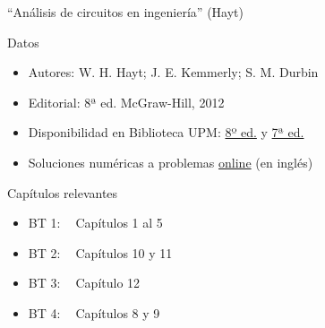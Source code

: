 \documentclass[aspectratio=169, usenames,svgnames,dvipsnames]{beamer}
\begin{document}

\begin{frame}{``Análisis de circuitos en ingeniería'' (\alert{Hayt})}
    \begin{block}{Datos}
        \begin{itemize}
        \item Autores: W. H. Hayt; J. E. Kemmerly; S. M. Durbin
        \item Editorial: 8ª ed. McGraw-Hill, 2012
        \item Disponibilidad en Biblioteca UPM: \href{https://ingenio.upm.es/primo-explore/fulldisplay?docid=34UPM\_ALMA2167505120004212\&context=L\&vid=34UPM\_VU1\&search\_scope=TAB1\_SCOPE1\&isFrbr=true\&tab=tab1\&lang=es\_ES}{8º ed.} y \href{https://ingenio.upm.es/primo-explore/fulldisplay?docid=34UPM\_ALMA2154460960004212\&context=L\&vid=34UPM\_VU1\&search\_scope=TAB1\_SCOPE1\&isFrbr=true\&tab=tab1\&lang=es\_ES}{7ª ed.}
        \item Soluciones numéricas a problemas \href{http://highered.mheducation.com/sites/0073529575/student\_view0/answers\_to\_selected\_problems.html}{online} (en inglés)
        \end{itemize}
    \end{block}
    
    \begin{block}{Capítulos relevantes}
        \begin{itemize}
        \item BT 1: $\;\;$ Capítulos 1 al 5
        \item BT 2: $\;\;$ Capítulos 10 y 11
        \item BT 3: $\;\;$ Capítulo 12
        \item BT 4: $\;\;$ Capítulos 8 y 9
        \end{itemize}
    \end{block}
\end{frame}

\end{document}
